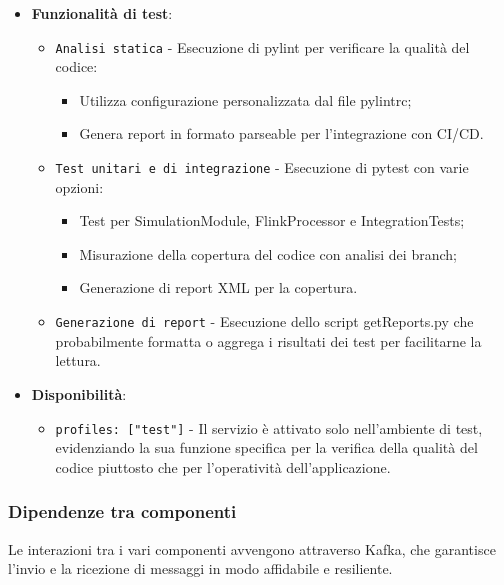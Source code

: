 \documentclass[10pt]{article}
\begin{document}
\begin{itemize}
        \item \textbf{Funzionalità di test}:
        \begin{itemize}
            \item \texttt{Analisi statica} - Esecuzione di pylint per verificare la qualità del codice:
            \begin{itemize}
                \item Utilizza configurazione personalizzata dal file pylintrc;
                \item Genera report in formato parseable per l'integrazione con CI/CD.
            \end{itemize}
            \item \texttt{Test unitari e di integrazione} - Esecuzione di pytest con varie opzioni:
            \begin{itemize}
                \item Test per SimulationModule, FlinkProcessor e IntegrationTests;
                \item Misurazione della copertura del codice con analisi dei branch;
                \item Generazione di report XML per la copertura.
            \end{itemize}
            \item \texttt{Generazione di report} - Esecuzione dello script getReports.py che probabilmente formatta o aggrega i risultati dei test per facilitarne la lettura.
        \end{itemize}
        
        \item \textbf{Disponibilità}:
        \begin{itemize}
            \item \texttt{profiles: ["test"]} - Il servizio è attivato solo nell'ambiente di test, evidenziando la sua funzione specifica per la verifica della qualità del codice piuttosto che per l'operatività dell'applicazione.
        \end{itemize}
        \end{itemize}



        

        

        \subsubsection{Dipendenze tra componenti}
        Le interazioni tra i vari componenti avvengono attraverso Kafka, che garantisce l'invio e la ricezione di messaggi in modo affidabile e resiliente.
\end{document}
